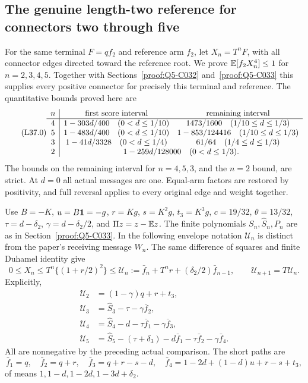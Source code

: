 \subsection{The genuine length-two reference for connectors two through five}\label{proof:Q5-C037}
For the same terminal $F=qf_2$ and reference arm $f_2$,
let $X_n=T^nF$, with all connector edges directed toward the reference
root. We prove $\mathbb E[f_2X_n^4]\le1$ for $n=2,3,4,5$.
Together with Sections~\ref{proof:Q5-C032} and~\ref{proof:Q5-C033} this supplies every positive
connector for precisely this terminal and reference. The quantitative
bounds proved here are
\begin{equation}\tag{L37.0}\label{eq:L37:claims}
\begin{array}{c|cc}
n&\text{first score interval}&\text{remaining interval}\\\hline
4&1-303d/400\quad(0<d\le1/10)&1473/1600\quad(1/10\le d\le1/3)\\
5&1-483d/400\quad(0<d\le1/10)&1-853/124416\quad(1/10\le d\le1/3)\\
3&1-41d/3328\quad(0<d\le1/4)&61/64\quad(1/4\le d\le1/3)\\
2&\multicolumn{2}{c}{1-259d/128000\quad(0<d\le1/3).}
\end{array}
\end{equation}
The bounds on the remaining interval for $n=4,5,3$, and the $n=2$
bound, are strict. At $d=0$ all actual
messages are one. Equal-arm factors are restored by positivity, and
full reversal applies to every original edge and weight together.

Use $B=-K$, $u=B\mathbf1=-g$, $r=Kg$, $s=K^2g$, $t_3=K^3g$,
$c=19/32$, $\theta=13/32$, $\tau=d-\delta_2$,
$\gamma=d-\delta_2/2$, and $\Pi z=z-\mathbb E z$.
The finite polynomials $S_n,\widehat S_n,P_n$ are as in
Section~\ref{proof:Q5-C033}. In the following envelope notation
$\mathcal U_n$ is distinct from the paper's receiving message $W_n$.
The same difference of squares and finite Duhamel identity give
\[
0\le X_n\le T^n\{(1+r/2)^2\}\le
\mathcal U_n:=\bar f_n+T^nr+(\delta_2/2)\bar f_{n-1},
\qquad\mathcal U_{n+1}=T\mathcal U_n.
\]
Explicitly,
\begin{equation}\tag{L37.1.4}\label{eq:L37:envelopes}
\begin{aligned}
\mathcal U_2&=(1-\gamma)q+r+t_3,\\
\mathcal U_3&=\widehat S_3-\tau-\gamma\bar f_2,\\
\mathcal U_4&=\widehat S_4-d-\tau\bar f_1-\gamma\bar f_3,\\
\mathcal U_5&=\widehat S_5-(\tau+\delta_3)-d\bar f_1
-\tau\bar f_2-\gamma\bar f_4.
\end{aligned}
\end{equation}
All are nonnegative by the preceding actual comparison. The short paths are
\[
\bar f_1=q,\quad\bar f_2=q+r,\quad\bar f_3=q+r-s-d,\quad
\bar f_4=1-2d+(1-d)u+r-s+t_3,
\]
of means $1,1-d,1-2d,1-3d+\delta_2$.

